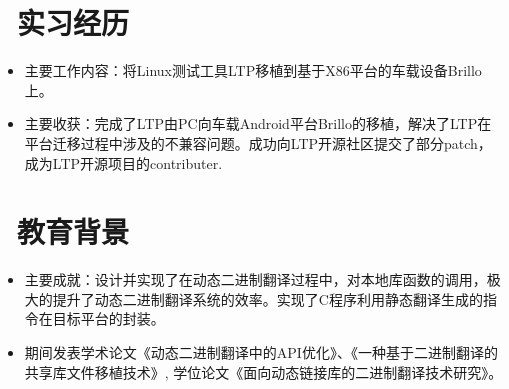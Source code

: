 \documentclass{resume}
\begin{document}

\section{\faUsers\ 实习经历}\normalsize
{}
\begin{itemize}
  \item {主要工作内容：将Linux测试工具LTP移植到基于X86平台的车载设备Brillo上。}
    \item {主要收获：完成了LTP由PC向车载Android平台Brillo的移植，解决了LTP在平台迁移过程中涉及的不兼容问题。成功向LTP开源社区提交了部分patch，成为LTP开源项目的contributer.}
\end{itemize}

\section{\faGraduationCap\  教育背景}\normalsize
{}
\begin{itemize}
\item {主要成就：设计并实现了在动态二进制翻译过程中，对本地库函数的调用，极大的提升了动态二进制翻译系统的效率。实现了C程序利用静态翻译生成的指令在目标平台的封装。}
  \item {期间发表学术论文《动态二进制翻译中的API优化》、《一种基于二进制翻译的共享库文件移植技术》, 学位论文《面向动态链接库的二进制翻译技术研究》。}
\end{itemize}

\end{document}
